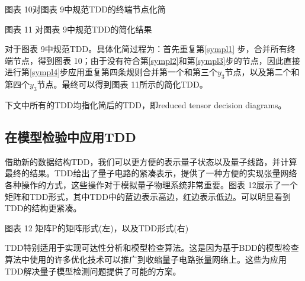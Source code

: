 图表 10对图表 9中规范TDD的终端节点化简
 
图表 11 对图表 9中规范TDD的简化结果

对于图表 9中规范TDD。具体化简过程为：首先重复第\ref{sympl1} 步，合并所有终端节点，得到图表 10；由于没有符合第\ref{sympl2}和第\ref{sympl3}步的节点，因此直接进行第\ref{sympl4}步应用重复第四条规则合并第一个和第三个$y_3$节点，以及第二个和第四个$y_3$节点。最终可以得到图表 11所示的简化TDD。

下文中所有的TDD均指化简后的TDD，即reduced tensor decision diagrams。

\subsection{在模型检验中应用TDD}
借助新的数据结构TDD，我们可以更方便的表示量子状态以及量子线路，并计算最终的结果。TDD给出了量子电路的紧凑表示，提供了一种方便的实现张量网络各种操作的方式，这些操作对于模拟量子物理系统非常重要。图表 12展示了一个矩阵和TDD形式，其中TDD中的蓝边表示高边，红边表示低边。可以明显看到TDD的结构更紧凑。
 	 
图表 12 矩阵P的矩阵形式(左)，以及TDD形式(右)

TDD特别适用于实现可达性分析和模型检查算法。这是因为基于BDD的模型检查算法中使用的许多优化技术可以推广到收缩量子电路张量网络上\citep{Chaki_2018}。这些为应用TDD解决量子模型检测问题提供了可能的方案。
